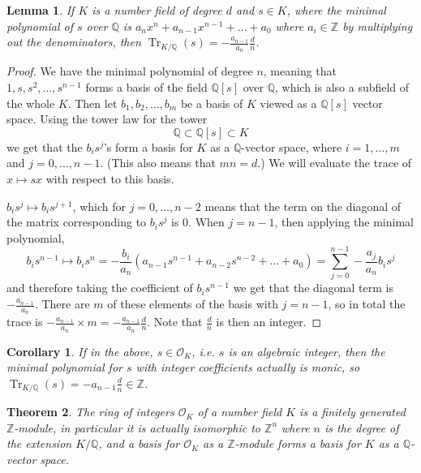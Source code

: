 \documentclass{article}
\newtheorem{theorem}{Theorem}[section]
\newtheorem{cor}{Corollary}[section]
\newtheorem{lemma}[theorem]{Lemma}
\theoremstyle{definition}
\theoremstyle{definition}
\theoremstyle{definition}
\begin{document}
\begin{lemma}
    If $K$ is a number field of degree $d$ and $s\in K$, where the minimal polynomial of $s$ over $\mathbb Q$ is $a_nx^n+a_{n-1}x^{n-1}+\dots+a_0$ where $a_i\in\mathbb Z$ by multiplying out the denominators, then $\operatorname{Tr}_{K/\mathbb Q}(s)=-\frac{a_{n-1}}{a_n}\frac{d}{n}$.
\end{lemma}
\begin{proof}
    We have the minimal polynomial of degree $n$, meaning that $1,s,s^2,\dots,s^{n-1}$ forms a basis of the field $\mathbb Q[s]$ over $\mathbb Q$, which is also a subfield of the whole $K$. Then let $b_1,b_2,\dots,b_m$ be a basis of $K$ viewed as a $\mathbb Q[s]$ vector space. Using the tower law for the tower
    $$\mathbb Q\subset\mathbb Q[s]\subset K$$
    we get that the $b_is^j$'s form a basis for $K$ as a $\mathbb Q$-vector space, where $i=1,\dots,m$ and $j=0,\dots,n-1$. (This also means that $mn=d$.) We will evaluate the trace of $x\mapsto sx$ with respect to this basis.

    $b_is^j\mapsto b_is^{j+1}$, which for $j=0,\dots,n-2$ means that the term on the diagonal of the matrix corresponding to $b_is^j$ is $0$. When $j=n-1$, then applying the minimal polynomial,
    $$b_is^{n-1}\mapsto b_is^n=-\frac{b_i}{a_n}(a_{n-1}s^{n-1}+a_{n-2}s^{n-2}+\dots+a_0)=\sum_{j=0}^{n-1}-\frac{a_j}{a_n}b_is^j$$
    and therefore taking the coefficient of $b_is^{n-1}$ we get that the diagonal term is $-\frac{a_{n-1}}{a_n}$. There are $m$ of these elements of the basis with $j=n-1$, so in total the trace is $-\frac{a_{n-1}}{a_n}\times m=-\frac{a_{n-1}}{a_n}\frac{d}{n}$. Note that $\frac{d}{n}$ is then an integer.
\end{proof}
\begin{cor}\label{traceint}
    If in the above, $s\in\mathcal O_K$, i.e. $s$ is an algebraic integer, then the minimal polynomial for $s$ with integer coefficients actually is monic, so $\operatorname{Tr}_{K/\mathbb{Q}}(s)=-a_{n-1}\frac{d}{n}\in\mathbb Z$.
\end{cor}

\begin{theorem}
\label{ring-of-integers-free-module}
    The ring of integers $\mathcal O_K$ of a number field $K$ is a finitely generated $\mathbb Z$-module, in particular it is actually isomorphic to $\mathbb{Z}^n$ where $n$ is the degree of the extension $K/\mathbb Q$, and a basis for $\mathcal O_K$ as a $\mathbb Z$-module forms a basis for $K$ as a $\mathbb Q$-vector space.
\end{theorem}
\end{document}
